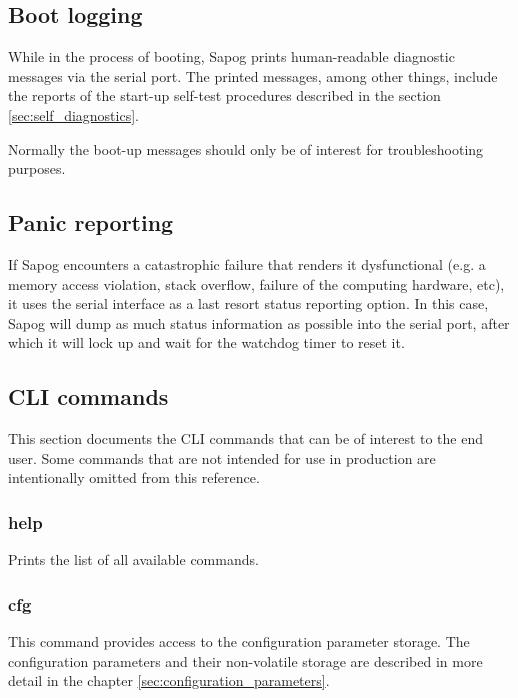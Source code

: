 \documentclass{zubaxdoc}
\begin{document}
\subsection{Boot logging}

While in the process of booting, Sapog prints human-readable diagnostic messages via the serial port.
The printed messages, among other things, include the reports of the start-up self-test procedures
described in the section \ref{sec:self_diagnostics}.

Normally the boot-up messages should only be of interest for troubleshooting purposes.

\subsection{Panic reporting}

If Sapog encounters a catastrophic failure that renders it dysfunctional
(e.g. a memory access violation, stack overflow, failure of the computing hardware, etc),
it uses the serial interface as a last resort status reporting option.
In this case, Sapog will dump as much status information as possible into the serial port,
after which it will lock up and wait for the watchdog timer to reset it.

\subsection{CLI commands}

This section documents the CLI commands that can be of interest to the end user.
Some commands that are not intended for use in production are intentionally omitted from this reference.

\subsubsection{help}

Prints the list of all available commands.

\subsubsection{cfg}

This command provides access to the configuration parameter storage.
The configuration parameters and their non-volatile storage are described in more detail in the chapter
\ref{sec:configuration_parameters}.
\end{document}
